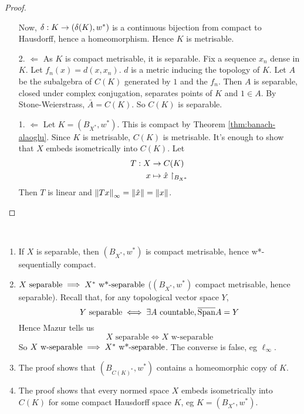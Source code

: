 \documentclass{article}
\begin{document}
\begin{proof}
\begin{itemize}
  Now, $\delta : K \rightarrow (\delta(K), w^*)$ is a continuous bijection from compact to Hausdorff, hence a homeomorphism. Hence $K$ is metrisable.
  \item[2. $\Leftarrow$] As $K$ is compact metrisable, it is separable. Fix a sequence $x_n$ dense in $K$. Let $f_n(x) = d(x, x_n)$. $d$ is a metric inducing the topology of $K$. Let $A$ be the subalgebra of $C(K)$ generated by $1$ and the $f_n$. Then $A$ is separable, closed under complex conjugation, separates points of $K$ and $1 \in A$. By Stone-Weierstrass, $\bar A = C(K)$. So $C(K)$ is separable.
  \item[1. $\Leftarrow$] Let $K = (B_{X^*}, w^*)$. This is compact by Theorem \ref{thm:banach-alaoglu}. Since $K$ is metrisable, $C(K)$ is metrisable. It's enough to show that $X$ embeds isometrically into $C(K)$. Let
  \begin{align*}
    T : X & \rightarrow C(K) \\
    x & \mapsto \hat x\restriction_{B_{X^*}}
  \end{align*}
  Then $T$ is linear and $\left\lVert Tx\right\rVert_\infty = \left\lVert \hat x\right\rVert = \left\lVert x\right\rVert$.
  \end{itemize}
\end{proof}

\begin{rmks}~
  \begin{enumerate}
    \item If $X$ is separable, then $(B_{X^*}, w^*)$ is compact metrisable, hence w*-sequentially compact.
    \item $X \text{ separable} \implies X^* \text{ w*-separable}$ ($(B_{X^*}, w^*)$ compact metrisable, hence separable). Recall that, for any topological vector space $Y$,
    $$Y \text{ separable} \iff \exists A\text{ countable}, \overline{\operatorname{Span}} A = Y$$
    Hence Mazur tells us
    $$X \text{ separable} \iff X \text{ w-separable}$$
    So $X \text{ w-separable} \implies X^* \text{ w*-separable}$. The converse is false, eg $\ell_\infty$.
    \item The proof shows that $(B_{C(K)^*}, w^*)$ contains a homeomorphic copy of $K$.
    \item The proof shows that every normed space $X$ embeds isometrically into $C(K)$ for some compact Hausdorff space $K$, eg $K = (B_{X^*}, w^*)$.
  \end{enumerate}
\end{rmks}
\end{document}
